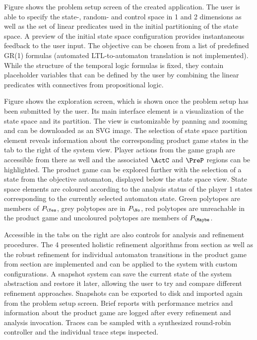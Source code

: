 

Figure  shows the problem setup screen of the created application.
The user is able to specify the state-, random- and control space in 1 and 2 dimensions as well as the set of linear predicates used in the initial partitioning of the state space.
A preview of the initial state space configuration provides instantaneous feedback to the user input.
The objective can be chosen from a list of predefined GR(1) formulas (automated LTL-to-automaton translation is not implemented).
While the structure of the temporal logic formulas is fixed, they contain placeholder variables that can be defined by the user by combining the linear predicates with connectives from propositional logic.

Figure  shows the exploration screen, which is shown once the problem setup has been submitted by the user.
Its main interface element is a visualization of the state space and its partition.
The view is customizable by panning and zooming and can be downloaded as an SVG image.
The selection of state space partition element reveals information about the corresponding product game states in the  tab to the right of the system view.
Player actions from the game graph are accessible from there as well and the associated $\ActC$ and $\PreP$ regions can be highlighted.
The product game can be explored further with the selection of a state from the objective automaton, displayed below the state space view.
State space elements are coloured according to the analysis status of the player 1 states corresponding to the currently selected automaton state.
Green polytopes are members of $P_\Yes$, grey polytopes are in $P_\No$, red polytopes are unreachable in the product game and uncoloured polytopes are members of $P_\Maybe$.

Accessible in the tabs on the right are also controls for analysis and refinement procedures.
The 4 presented holistic refinement algorithms from section  as well as the robust refinement for individual automaton transitions in the product game from section  are implemented and can be applied to the system with custom configurations.
A snapshot system can save the current state of the system abstraction and restore it later, allowing the user to try and compare different refinement approaches.
Snapshots can be exported to disk and imported again from the problem setup screen.
Brief reports with performance metrics and information about the product game are logged after every refinement and analysis invocation.
Traces can be sampled with a synthesized round-robin controller and the individual trace steps inspected.

